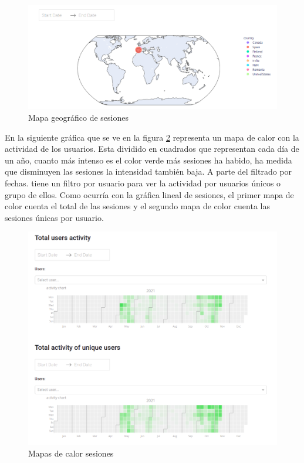 \begin{figure}[H]
    \centering
    \includegraphics[width=17cm, keepaspectratio]{img/mundo.png}
    \caption{Mapa geográfico de sesiones}
    \label{fig:mundo}
\end{figure}
\newpage
En la siguiente gráfica que se ve en la figura \ref{fig:activity} representa un mapa de calor con la actividad de los usuarios. Esta dividido en cuadrados que representan cada día de un año, cuanto más intenso es el color verde más sesiones ha habido, ha medida que disminuyen las sesiones la intensidad también baja. A parte del filtrado por fechas. tiene un filtro por usuario para ver la actividad por usuarios únicos o grupo de ellos. Como ocurría con la gráfica lineal de sesiones, el primer mapa de color cuenta el total de las sesiones y el segundo mapa de color cuenta las sesiones únicas por usuario.


\begin{figure}[H]
    \centering
    \includegraphics[width=17cm, keepaspectratio]{img/activity.png}
    \caption{Mapas de calor sesiones}
    \label{fig:activity}
\end{figure}
\newpage

